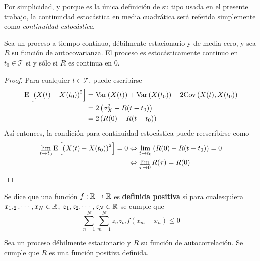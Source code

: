 Por simplicidad, y porque es la única definición de su tipo usada en el presente trabajo, la continuidad estocástica en media cuadrática será referida simplemente como \textit{continuidad estocástica}.


\begin{proposicion}
Sea \xt un proceso a tiempo continuo, débilmente estacionario y de media cero, y sea $R$ su función de autocovarianza. El proceso es estocásticamente continuo en $t_0\in \mathcal{T}$ si y sólo si $R$ es continua en $0$.
\end{proposicion}

\begin{proof}
Para cualquier $t\in \mathcal{T}$, puede escribirse
\begin{align*}
\mathrm{E}\left[ \left( X(t) - X(t_0) \right)^{2} \right] &= \mathrm{Var}\left( X(t) \right) + \mathrm{Var}\left( X(t_0) \right) - 2 \mathrm{Cov}\left( X(t),X(t_0) \right) \\
&= 2 \left( \sigma_X^{2} - R(t-t_0) \right) \\
&= 2 \left( R(0) - R(t-t_0) \right)
\end{align*}
Así entonces, la condición para continuidad estocástica puede reescribirse como
\begin{align*}
\lim_{t \rightarrow t_0} \mathrm{E}\left[ \left( X(t) - X(t_0) \right)^{2} \right] = 0 
&\Leftrightarrow
\lim_{t \rightarrow t_0} \left( R(0) - R(t-t_0) \right) = 0 \\
&\Leftrightarrow
\lim_{\tau \rightarrow 0} R(\tau) = R(0)
\end{align*}
\end{proof}

\begin{definicion}
Se dice que una función $f: \mathbb{R}\rightarrow \mathbb{R}$ es \textbf{definida positiva} si para cualesquiera $x_1, _2, \cdots, x_N \in \mathbb{R}$, $z_1, z_2, \cdots, z_N \in \mathbb{R}$ se cumple que 
\begin{equation}
\sum_{n=1}^{N} \sum_{m=1}^{N} z_n z_m f(x_m-x_n) \leq 0
\end{equation}
\end{definicion}

\begin{proposicion}
Sea \xt un proceso débilmente estacionario y $R$ su función de autocorrelación. Se cumple que $R$ es una función positiva definida.
\end{proposicion}

